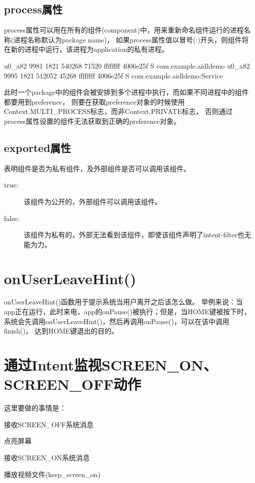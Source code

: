 ﻿\documentclass[a4paper,11pt]{article}
\begin{document}
  \subsection[process属性]{process属性}
  process属性可以用在所有的组件(component)中，用来重新命名组件运行的进程名称(进程名称默认为package name)，
  如果process属性值以冒号(:)开头，则组件将在新的进程中运行，该进程为application的私有进程。\par
  \begin{bashcode}
u0_a82    9981  1821  540268 71520 ffffffff 4006e25f S com.example.aidldemo
u0_a82    9995  1821  512052 45268 ffffffff 4006e25f S com.example.aidldemo:Service
  \end{bashcode}
  
  此时一个package中的组件会被安排到多个进程中执行，而如果不同进程中的组件都要用到preference，
  则要在获取preference对象的时候使用Context.MULTI\_PROCESS标志，而非Context.PRIVATE标志，
  否则通过process属性设置的组件无法获取到正确的preference对象。

  \subsection[exported属性]{exported属性}
  表明组件是否为私有组件，及外部组件是否可以调用该组件。
  \begin{description}
    \item[true:] 该组件为公开的，外部组件可以调用该组件。
    \item[false:] 该组件为私有的，外部无法看到该组件，即使该组件声明了intent-filter也无能为力。
  \end{description}

  \section[onUserLeaveHint()]{onUserLeaveHint()}
  onUserLeaveHint()函数用于提示系统当用户离开之后该怎么做。
  举例来说：当app正在运行，此时来电，app的onPause()被执行；但是，当HOME键被按下时，
  系统会先调用onUserLeaveHint()，然后再调用onPause()，可以在该中调用finish()，
  达到HOME键退出的目的。

  \section[通过Intent监视SCREEN\_ON、SCREEN\_OFF动作]{通过Intent监视SCREEN\_ON、SCREEN\_OFF动作}
  这里要做的事情是：
  \begin{coloredenumerate}
    \item 接收SCREEN\_OFF系统消息
    \item 点亮屏幕
    \item 接收SCREEN\_ON系统消息
    \item 播放视频文件(keep\_screen\_on)
  \end{coloredenumerate}
\end{document}
